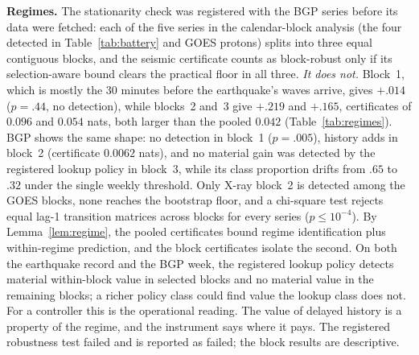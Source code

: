 \documentclass[11pt]{article}
\begin{document}
\textbf{Regimes.} The stationarity check was registered with the BGP
series before its data were fetched: each of the five series in the
calendar-block analysis (the four detected in Table~\ref{tab:battery}
and GOES protons) splits into three equal contiguous blocks, and the
seismic certificate counts as block-robust only if its selection-aware
bound clears the practical floor in all three. \emph{It does not.} Block~1,
which is mostly the 30 minutes before the earthquake's waves arrive, gives
$+.014$ ($p=.44$, no detection), while blocks~2 and~3 give $+.219$ and
$+.165$, certificates of $0.096$ and $0.054$ nats, both larger than the
pooled $0.042$ (Table~\ref{tab:regimes}). BGP shows the same shape: no
detection in block~1 ($p=.005$), history adds in block~2 (certificate
$0.0062$ nats), and no material gain was detected by the registered lookup policy in block~3, while its class proportion drifts
from $.65$ to $.32$ under the single weekly threshold. Only X-ray block~2 is
detected among the GOES blocks, none reaches the bootstrap floor, and a chi-square test
rejects equal lag-1 transition matrices across blocks for every series
($p\le10^{-4}$). By Lemma~\ref{lem:regime}, the pooled certificates bound
regime identification plus within-regime prediction, and the block
certificates isolate the second. On both the earthquake record and the
BGP week, the registered lookup policy detects material within-block value
in selected blocks and no material value in the remaining blocks; a richer
policy class could find value the lookup class does not. For a controller
this is the operational reading. The value of
delayed history is a property of the regime, and the instrument says
where it pays. The registered robustness test failed and is reported as
failed; the block results are descriptive.
\end{document}
